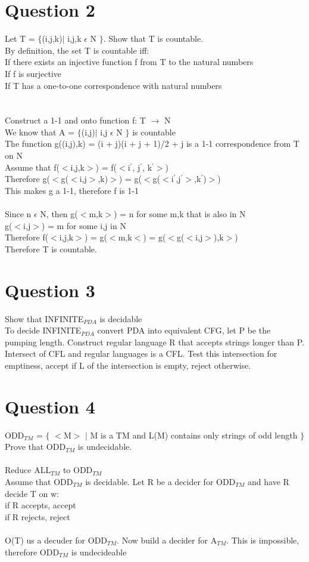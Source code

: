 \documentclass[10pt,a4paper]{article}
\begin{document}
\section*{Question 2}
Let T = $\lbrace$(i,j,k)$\mid$ i,j,k $\epsilon$ N $\rbrace$. Show that T is countable.\\
By definition, the set T is countable iff:\\
If there exists an injective function f from T to the natural numbers\\
If f is surjective\\
If T has a one-to-one correspondence with natural numbers\\
\\\\
Construct a 1-1 and onto function f: T $\rightarrow$ N\\
We know that A = $\lbrace$(i,j)$\mid$ i,j $\epsilon$ N $\rbrace$ is countable\\
The function g((i,j),k) = (i + j)(i + j + 1)/2 + j is a 1-1 correspondence from T on N\\
Assume that f($<$i,j,k$>$) = f($<$i$^{'}$, j$^{'}$, k$^{'}$$>$)\\
Therefore g($<$g($<$i,j$>$,k)$>$) = g($<$g($<$i$^{'}$,j$^{'}$$>$,k$^{'}$)$>$)\\
This makes g a 1-1, therefore f is 1-1\\
\\
Since n $\epsilon$ N, then g($<$m,k$>$) = n for some m,k that is also in N\\
g($<$i,j$>$) = m for some i,j in N\\
Therefore f($<$i,j,k$>$) = g($<$m,k$<$) = g($<$g($<$i,j$>$),k$>$)\\
Therefore T is countable.
\section*{Question 3}
Show that INFINITE$_{PDA}$ is decidable\\
To decide INFINITE$_{PDA}$ convert PDA into equivalent CFG, let P be the pumping length. Construct regular language R that accepts strings longer than P. Intersect of CFL and regular languages is a CFL. Test this intersection for emptiness, accept if L of the intersection is empty, reject otherwise.
\section*{Question 4}
ODD$_{TM}$ = $\lbrace$ $<$M$>$ $\mid$ M is a TM and L(M) contains only strings of odd length $\rbrace$
Prove that ODD$_{TM}$ is undecidable.\\
\\
Reduce ALL$_{TM}$ to ODD$_{TM}$\\
Assume that ODD$_{TM}$ is decidable. Let R be a decider for ODD$_{TM}$ and have R decide T on w:\\
if R accepts, accept\\
if R rejects, reject\\
\\
O(T) us a decuder for ODD$_{TM}$. Now build a decider for A$_{TM}$. This is impossible, therefore ODD$_{TM}$ is undecideable
\end{document}
